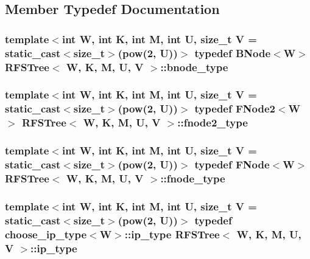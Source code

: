 \subsection{Member Typedef Documentation}
\hypertarget{classRFSTree_a14c0aee24b9913173d3d9aaa93a6e3ce}{
\subsubsection[{bnode\-\_\-type}]{\setlength{\rightskip}{0pt plus 5cm}template$<$int W, int K, int M, int U, size\-\_\-t V = static\-\_\-cast$<$size\-\_\-t$>$(pow(2, U))$>$ typedef {\bf B\-Node}$<${\bf W}$>$ {\bf R\-F\-S\-Tree}$<$ {\bf W}, K, M, U, V $>$\-::{\bf bnode\-\_\-type}\hspace{0.3cm}{\ttfamily [private]}}}\label{classRFSTree_a14c0aee24b9913173d3d9aaa93a6e3ce}
\hypertarget{classRFSTree_a0546714395e729135c856124425e97be}{
\subsubsection[{fnode2\-\_\-type}]{\setlength{\rightskip}{0pt plus 5cm}template$<$int W, int K, int M, int U, size\-\_\-t V = static\-\_\-cast$<$size\-\_\-t$>$(pow(2, U))$>$ typedef {\bf F\-Node2}$<${\bf W}$>$ {\bf R\-F\-S\-Tree}$<$ {\bf W}, K, M, U, V $>$\-::{\bf fnode2\-\_\-type}\hspace{0.3cm}{\ttfamily [private]}}}\label{classRFSTree_a0546714395e729135c856124425e97be}
\hypertarget{classRFSTree_a82d6848400f7c2700a6283cb34bca3eb}{
\subsubsection[{fnode\-\_\-type}]{\setlength{\rightskip}{0pt plus 5cm}template$<$int W, int K, int M, int U, size\-\_\-t V = static\-\_\-cast$<$size\-\_\-t$>$(pow(2, U))$>$ typedef {\bf F\-Node}$<${\bf W}$>$ {\bf R\-F\-S\-Tree}$<$ {\bf W}, K, M, U, V $>$\-::{\bf fnode\-\_\-type}\hspace{0.3cm}{\ttfamily [private]}}}\label{classRFSTree_a82d6848400f7c2700a6283cb34bca3eb}
\hypertarget{classRFSTree_a7cb02a7e27a8d7ff16271e33dbba26eb}{
\subsubsection[{ip\-\_\-type}]{\setlength{\rightskip}{0pt plus 5cm}template$<$int W, int K, int M, int U, size\-\_\-t V = static\-\_\-cast$<$size\-\_\-t$>$(pow(2, U))$>$ typedef {\bf choose\-\_\-ip\-\_\-type}$<${\bf W}$>$\-::{\bf ip\-\_\-type} {\bf R\-F\-S\-Tree}$<$ {\bf W}, K, M, U, V $>$\-::{\bf ip\-\_\-type}\hspace{0.3cm}{\ttfamily [private]}}}\label{classRFSTree_a7cb02a7e27a8d7ff16271e33dbba26eb}
